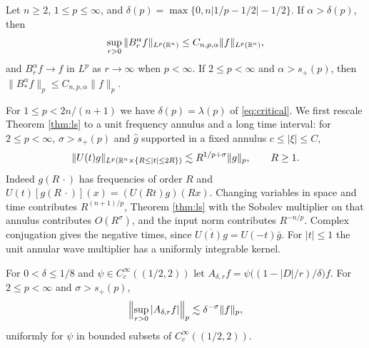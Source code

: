 \begin{theorem}\label{thm:BR}
Let $n\ge2$, $1\le p\le\infty$, and $\delta(p)=\max\{0,n|1/p-1/2|-1/2\}$. If $\alpha>\delta(p)$, then
\begin{equation}\label{eq:BRall}
\sup_{r>0}\|B^\alpha_rf\|_{L^p(\mathbb{R}^n)}\le C_{n,p,\alpha}\|f\|_{L^p(\mathbb{R}^n)} ,
\end{equation}
and $B^\alpha_rf\to f$ in $L^p$ as $r\to\infty$ when $p<\infty$. If $2\le p<\infty$ and
$\alpha>s_+(p)$, then $\|B^\alpha_*f\|_p\le C_{n,p,\alpha}\|f\|_p$.
\end{theorem}

For $1\le p<2n/(n+1)$ we have $\delta(p)=\lambda(p)$ of \eqref{eq:critical}. We first rescale Theorem
\ref{thm:ls} to a unit frequency annulus and a long time interval: for $2\le p<\infty$,
$\sigma>s_+(p)$ and $\hat g$ supported in a fixed annulus $c\le|\xi|\le C$,
\begin{equation}\label{eq:longtime}
\|U(t)g\|_{L^p(\mathbb{R}^n\times\{R\le|t|\le2R\})}\lesssim R^{1/p+\sigma}\|g\|_p,\qquad R\ge1 .
\end{equation}
Indeed $g(R\,\cdot)$ has frequencies of order $R$ and $U(t)[g(R\,\cdot)](x)=(U(Rt)g)(Rx)$. Changing
variables in space and time contributes $R^{(n+1)/p}$, Theorem \ref{thm:ls} with the Sobolev
multiplier on that annulus contributes $O(R^\sigma)$, and the input norm contributes $R^{-n/p}$.
Complex conjugation gives the negative times, since $\overline{U(t)g}=U(-t)\bar g$. For $|t|\le1$ the
unit annular wave multiplier has a uniformly integrable kernel.

\begin{lemma}\label{lem:shell}
For $0<\delta\le1/8$ and $\psi\in C_c^\infty((1/2,2))$ let
$A_{\delta,r}f=\psi\bigl((1-|D|/r)/\delta\bigr)f$. For $2\le p<\infty$ and $\sigma>s_+(p)$,
\[
\Bigl\|\sup_{r>0}|A_{\delta,r}f|\Bigr\|_p\lesssim\delta^{-\sigma}\|f\|_p ,
\]
uniformly for $\psi$ in bounded subsets of $C_c^\infty((1/2,2))$.
\end{lemma}

